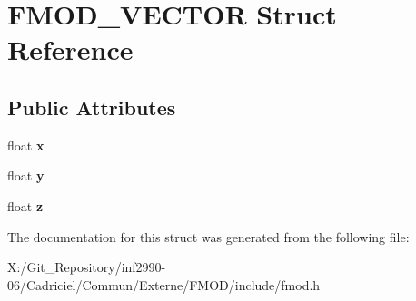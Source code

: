 \hypertarget{struct_f_m_o_d___v_e_c_t_o_r}{\section{F\-M\-O\-D\-\_\-\-V\-E\-C\-T\-O\-R Struct Reference}
\label{struct_f_m_o_d___v_e_c_t_o_r}
}
\subsection*{Public Attributes}
\begin{DoxyCompactItemize}
\item 
\hypertarget{struct_f_m_o_d___v_e_c_t_o_r_afe9fad8ce812c3cfc021c25bbb8bc0e8}{float {\bfseries x}}\label{struct_f_m_o_d___v_e_c_t_o_r_afe9fad8ce812c3cfc021c25bbb8bc0e8}

\item 
\hypertarget{struct_f_m_o_d___v_e_c_t_o_r_abea7feb26ece298baa766f821b8686ff}{float {\bfseries y}}\label{struct_f_m_o_d___v_e_c_t_o_r_abea7feb26ece298baa766f821b8686ff}

\item 
\hypertarget{struct_f_m_o_d___v_e_c_t_o_r_ab64088b1bd2e695bd1abc6b370b71796}{float {\bfseries z}}\label{struct_f_m_o_d___v_e_c_t_o_r_ab64088b1bd2e695bd1abc6b370b71796}

\end{DoxyCompactItemize}


The documentation for this struct was generated from the following file\-:\begin{DoxyCompactItemize}
\item 
X\-:/\-Git\-\_\-\-Repository/inf2990-\/06/\-Cadriciel/\-Commun/\-Externe/\-F\-M\-O\-D/include/fmod.\-h\end{DoxyCompactItemize}
